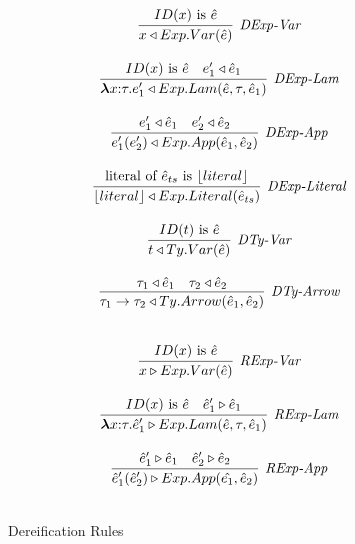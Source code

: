 \begin{figure}
\centering
\begin{minipage}{.5\textwidth}
  \centering
   \[
\begin{array}{c}

\infer[\textit{DExp-Var}]
	{ x \triangleleft Exp.Var(\hat{e})   }
	{ ID(x)\ \text{is}\ \hat{e}} \\[3ex]

\infer[\textit{DExp-Lam}]
	{ \boldsymbol\lambda x{:}\tau . e'_1 \triangleleft Exp.Lam( \hat{e}, \tau, \hat{e}_1 )  }
	{ID(x)\ \text{is}\ \hat{e} & e'_1 \triangleleft \hat{e}_1  } \\[3ex]

\infer[\textit{DExp-App}]
	{ e'_1(e'_2)  \triangleleft Exp.App(\hat{e}_1,\hat{e}_2) }
	{ e'_1 \triangleleft \hat{e}_1  & e'_2 \triangleleft \hat{e}_2   } \\[3ex]

\infer[\textit{DExp-Literal}]
	{ \lfloor literal \rfloor \triangleleft Exp.Literal( \hat{e}_{ts} )  }
	{ \text{literal of}\ \hat{e}_{ts}\ \text{is}\ \lfloor literal \rfloor  } \\[3ex]

\infer[\textit{DTy-Var}]
	{ t \triangleleft Ty.Var(\hat{e})   }
	{ ID(t)\ \text{is}\ \hat{e}} \\[3ex]

\infer[\textit{DTy-Arrow}]
	{ \tau_1 \rightarrow \tau_2 \triangleleft Ty.Arrow(\hat{e}_1,\hat{e}_2 )  }
	{ \tau_1 \triangleleft \hat{e}_1 & \tau_2 \triangleleft \hat{e}_2 } \\[3ex]
   
\end{array}
\]
\caption{Dereification Rules}
\end{minipage}%
\vline
\begin{minipage}{.5\textwidth}
  \centering
  \[
\begin{array}{c}
\infer[\textit{RExp-Var}]
	{ x \triangleright Exp.Var(\hat{e})   }
	{ ID(x)\ \text{is}\ \hat{e}} \\[3ex]

\infer[\textit{RExp-Lam}]
	{ \boldsymbol\lambda x{:}\tau . \hat{e}'_1 \triangleright Exp.Lam( \hat{e}, \tau, \hat{e}_1 )  }
	{ID(x)\ \text{is}\ \hat{e} & \hat{e}'_1 \triangleright \hat{e}_1  } \\[3ex]

\infer[\textit{RExp-App}]
	{ \hat{e}'_1(\hat{e}'_2)  \triangleright Exp.App(\hat{e_1},\hat{e}_2) }
	{ \hat{e}'_1 \triangleright \hat{e}_1  & \hat{e}'_2 \triangleright \hat{e}_2   } \\[3ex]


\end{array}\]
\end{minipage}
\end{figure}
